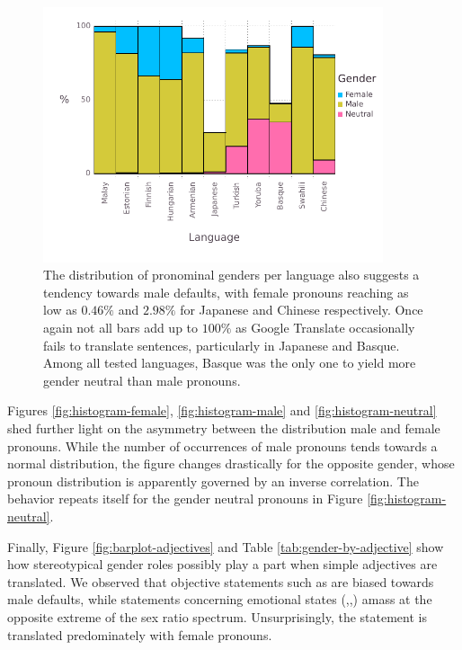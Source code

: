 \documentclass[fleqn,10pt]{article}
\begin{document}
\begin{figure}[H]
	\centering
	\includegraphics[width=10cm]{pictures/gender-by-language}
	\caption{The distribution of pronominal genders per language also suggests a tendency towards male defaults, with female pronouns reaching as low as $0.46\%$ and $2.98\%$ for Japanese and Chinese respectively. Once again not all bars add up to $100\%$ as Google Translate occasionally fails to translate sentences, particularly in Japanese and Basque. Among all tested languages, Basque was the only one to yield more gender neutral than male pronouns.}
	\label{fig:gender-by-language}
\end{figure}

Figures \ref{fig:histogram-female}, \ref{fig:histogram-male} and \ref{fig:histogram-neutral} shed further light on the asymmetry between the distribution male and female pronouns. While the number of occurrences of male pronouns tends towards a normal distribution, the figure changes drastically for the opposite gender, whose pronoun distribution is apparently governed by an inverse correlation. The behavior repeats itself for the gender neutral pronouns in Figure \ref{fig:histogram-neutral}.

Finally, Figure \ref{fig:barplot-adjectives} and Table \ref{tab:gender-by-adjective} show how stereotypical gender roles possibly play a part when simple adjectives are translated. We observed that objective statements such as  are biased towards male defaults, while statements concerning emotional states (,,) amass at the opposite extreme of the sex ratio spectrum. Unsurprisingly, the statement  is translated predominately with female pronouns.
\end{document}
